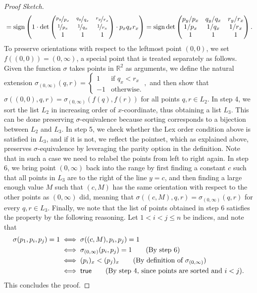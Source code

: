 \begin{proof}[Proof Sketch]
\[\begin{multlined}
                        = \sign \left(1 \cdot \det  \begin{pmatrix} \nicefrac{p_y}{p_x} & \nicefrac{q_y}{q_x} & \nicefrac{r_y}{r_x} \\ \nicefrac{1}{p_x} & \nicefrac{1}{q_x} & \nicefrac{1}{r_x} \\ 1 & 1 & 1 \end{pmatrix} \cdot  p_x q_x r_x  \right) = \sign \det \begin{pmatrix} p_y/p_x & q_y/q_x & r_y/r_x \\ 1/p_x & 1/q_x & 1/r_x \\ 1 & 1 & 1 \end{pmatrix}.
\end{multlined}
\]
To preserve orientations with respect to the leftmost point $(0, 0)$, we set $f( (0, 0)) = (0, \infty)$, a special point that is treated separately as follows. Given the function $\sigma$ takes points in $\mathbb{R}^2$ as arguments, we define the natural extension
\(
  \sigma_{(0, \infty)}(q, r) = \begin{cases}
    1 & \text{if } q_x < r_x \\
    -1 & \text{otherwise}.  
  \end{cases},
\)
and then show that $\sigma((0, 0), q, r) = \sigma_{(0, \infty)}(f(q), f(r))$ for all points $q, r \in L_2$. 
In step 4, we sort the list $L_2$ in increasing order of $x$-coordinate, thus obtaining a list $L_3$. This can be done preserving $\sigma$-equivalence because sorting corresponds to a bijection between $L_2$ and $L_3$.
In step 5, we check whether the \textsf{Lex order} condition above is satisfied in $L_3$, and if it is not, we reflect the pointset, which as explained above, preserves $\sigma$-equivalence by leveraging the parity option in the definition. Note that in such a case we need to relabel the points from left to right again.
In step 6, we bring point $(0, \infty)$ back into the range by first finding a constant $c$ such that all points in $L_3$ are to the right of the line $y=c$, and then finding a large enough value $M$ such that $(c, M)$ has the same orientation with respect to the other points as $(0, \infty)$ did, meaning that 
\(\sigma((c, M), q, r) = \sigma_{(0, \infty)}(q, r)\) for every $q, r \in L_3$.
Finally, we note that the list of points obtained in step 6 satisfies the  property by the following reasoning. Let $1 < i < j \leq n$ be indices, and note that 
\begin{align*}
  \sigma(p_1, p_i, p_j) = 1 &\iff \sigma((c, M), p_i, p_j) = 1\\
                            &\iff \sigma_{(0, \infty)}(p_i, p_j) = 1\tag{By step 6}\\
                            &\iff (p_i)_x < (p_j)_x \tag{By definition of $\sigma_{(0, \infty)}$}\\
                            &\iff \textsf{true} \tag{By step 4, since points are sorted and $i < j$}.
\end{align*}
This concludes the proof.
\end{proof}

